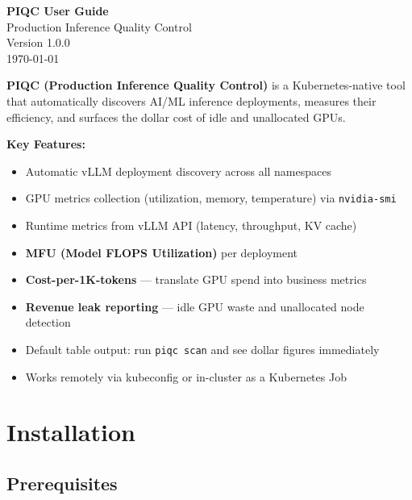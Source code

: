 \documentclass[11pt,a4paper]{article}
\begin{document}
\begin{center}
    {\Huge\textbf{PIQC User Guide}}\\[0.5em]
    {\Large Production Inference Quality Control}\\[2em]
    {\large Version 1.0.0}\\[1em]
    \today
\end{center}

\vspace{2em}

\begin{tcolorbox}[colback=blue!5,colframe=blue!50!black,title=\textbf{What is PIQC?}]
\textbf{PIQC (Production Inference Quality Control)} is a Kubernetes-native tool that automatically discovers AI/ML inference deployments, measures their efficiency, and surfaces the dollar cost of idle and unallocated GPUs.

\textbf{Key Features:}
\begin{itemize}
    \item Automatic vLLM deployment discovery across all namespaces
    \item GPU metrics collection (utilization, memory, temperature) via \texttt{nvidia-smi}
    \item Runtime metrics from vLLM API (latency, throughput, KV cache)
    \item \textbf{MFU (Model FLOPS Utilization)} per deployment
    \item \textbf{Cost-per-1K-tokens} — translate GPU spend into business metrics
    \item \textbf{Revenue leak reporting} — idle GPU waste and unallocated node detection
    \item Default table output: run \texttt{piqc scan} and see dollar figures immediately
    \item Works remotely via kubeconfig or in-cluster as a Kubernetes Job
\end{itemize}
\end{tcolorbox}

\newpage
\tableofcontents
\newpage

\section{Installation}

\subsection{Prerequisites}
\end{document}
